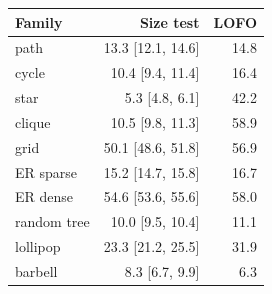 \begin{tabular}{lrr}
\toprule
Family & Size test & LOFO\\
\midrule
path & 13.3 [12.1, 14.6] & 14.8 \\
cycle & 10.4 [9.4, 11.4] & 16.4 \\
star & 5.3 [4.8, 6.1] & 42.2 \\
clique & 10.5 [9.8, 11.3] & 58.9 \\
grid & 50.1 [48.6, 51.8] & 56.9 \\
ER sparse & 15.2 [14.7, 15.8] & 16.7 \\
ER dense & 54.6 [53.6, 55.6] & 58.0 \\
random tree & 10.0 [9.5, 10.4] & 11.1 \\
lollipop & 23.3 [21.2, 25.5] & 31.9 \\
barbell & 8.3 [6.7, 9.9] & 6.3 \\
\bottomrule
\end{tabular}
